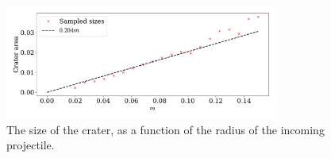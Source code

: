 \documentclass{article}
\begin{document}
            \begin{figure}
                \centering
                \includegraphics[width=0.8\textwidth]{../plots/problem4/crater_size.pdf}
                \caption{The size of the crater, as a function of the radius of the incoming projectile.}
                \label{crater size}
            \end{figure}

    
       
\end{document}
